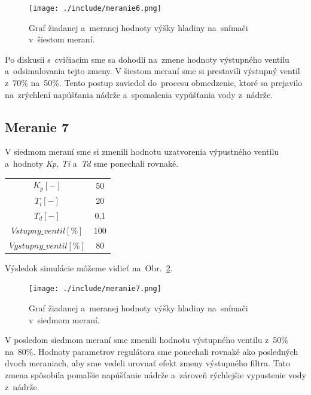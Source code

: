 \documentclass{article}
\begin{document}
\begin{figure}[!htbp]
	\begin{center}
		\texttt{[image: ./include/meranie6.png]}
	\end{center}
	\caption{Graf žiadanej a~meranej hodnoty výšky hladiny na~snímači v~šiestom meraní.}
	\label{fig:m6}
\end{figure}

Po diskusii s~cvičiacim sme sa dohodli na~zmene hodnoty výstupného ventilu a~odsimulovania tejto zmeny.
V šiestom meraní sme si prestavili výstupný ventil z~70\% na~50\%. Tento postup zaviedol do~procesu
obmedzenie, ktoré sa prejavilo na~zrýchlení napúšťania nádrže a~spomalenia vypúšťania vody z~nádrže.

\clearpage

\subsection{Meranie 7}
\label{sec:meranie7}

V siedmom meraní sme si zmenili hodnotu uzatvorenia výpustného ventilu a~hodnoty \textit{Kp}, \textit{Ti}
a~\textit{Td} sme ponechali rovnaké.

\begin{center}
\begin{tabular}{ |c|c| }
 \hline
 $K_p [-]$ & 50 \\
 $T_i [-]$ & 20 \\
 $T_d [-]$ & 0,1 \\
 \hline
 $Vstupny\_ventil[\%]$ & 100 \\
 $Vystupny\_ventil[\%]$ & 80 \\
 \hline
\end{tabular}
\end{center}

Výsledok simulácie môžeme vidieť na~Obr.~\ref{fig:m7}.

\begin{figure}[!htbp]
	\begin{center}
		\texttt{[image: ./include/meranie7.png]}
	\end{center}
	\caption{Graf žiadanej a~meranej hodnoty výšky hladiny na~snímači v~siedmom meraní.}
	\label{fig:m7}
\end{figure}

V posledom siedmom meraní sme zmenili hodnotu výstupného ventilu z~50\% na~80\%. Hodnoty parametrov
regulátora sme ponechali rovnaké ako posledných dvoch meraniach, aby sme vedeli urovnať efekt zmeny
výstupného filtra. Tato zmena spôsobila pomalšie napúšťanie nádrže a~zároveň rýchlejšie vypustenie
vody z~nádrže.
\end{document}
